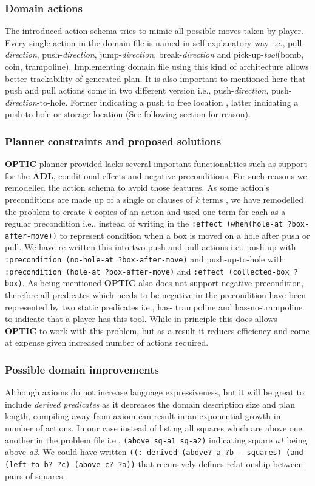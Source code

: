 \documentclass[letterpaper]{article} %
\begin{document}
\subsubsection{Domain actions}
The introduced action schema tries to mimic all possible moves taken by player. Every single action in the domain file is named in self-explanatory way i.e., pull-\emph{direction}, push-\emph{direction}, jump-\emph{direction}, break-\emph{direction} and pick-up-\emph{tool}(bomb, coin, trampoline). Implementing domain file using this kind of architecture allows better trackability of generated plan. It is also important to mentioned here that push and pull actions come in two different version i.e., push-\emph{direction}, push-\emph{direction}-to-hole. Former indicating a push to free location , latter indicating a push to hole or storage location (See following section for reason).

\subsubsection{Planner constraints and proposed solutions}
\textbf{OPTIC} planner provided lacks several important functionalities such as support for the \textbf{ADL}, conditional effects and negative preconditions. For such reasons we remodelled the action schema to avoid those features. As some action’s preconditions are made up of a single or clauses of \emph{k} terms \cite{haslum_2019}, we have remodelled the problem to create \emph{k} copies of an action and used one term for each as a regular precondition i.e., instead of writing in the \texttt{:effect (when(hole-at ?box-after-move))} to represent condition when a box is moved on a hole after push or pull. We have re-written this into two push and pull actions i.e., push-up with \texttt{:precondition (no-hole-at ?box-after-move)} and push-up-to-hole with \texttt{:precondition (hole-at ?box-after-move)} and \texttt{:effect (collected-box ?box)}. As being mentioned \textbf{OPTIC}  also does not support negative precondition, therefore all predicates which needs to be negative in the precondition have been represented by two static predicates i.e., has- trampoline and has-no-trampoline to indicate that a player has this tool. While in principle this does allows \textbf{OPTIC} to work with this problem, but as a result it reduces efficiency and come at expense given increased number of actions required.   

\subsubsection{Possible domain improvements}
Although axioms do not increase language expressiveness, but it will be great to include \emph{derived predicates} as it decreases the domain description size and plan length, compiling away from axiom can result in an exponential growth in number of actions. In our case instead of listing all squares which are above one another in the problem file i.e., \texttt{(above sq-a1 sq-a2)} indicating square \emph{a1} being above \emph{a2}. We could have written \texttt{((: derived (above? a ?b - squares) (and (left-to b?  ?c) (above c? ?a))} that recursively defines relationship between pairs of squares.   
\end{document}
